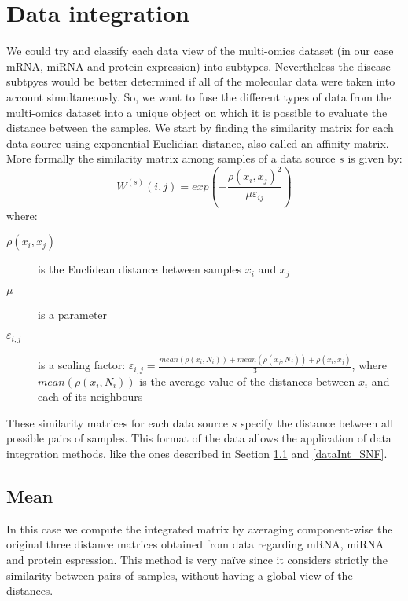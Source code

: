 \section{Data integration}\label{methods_dataInt}
We could try and classify each data view of the multi-omics dataset (in our case mRNA, miRNA and protein expression) into subtypes. Nevertheless the disease subtpyes would be better determined if all of the molecular data were taken into account simultaneously. So, we want to fuse the different types of data from the multi-omics dataset into a unique object on which it is possible to evaluate the distance between the samples. We start by finding the similarity matrix for each data source using exponential Euclidian distance, also called an affinity matrix.
More formally the similarity matrix among samples of a data source $s$ is given by:
\begin{equation} \label{eq:scaled_exponential_sim}
    W^{(s)}(i,j) = exp \left(- \frac{\rho(x_i,x_j)^2}{\mu \varepsilon_{ij}}\right)
\end{equation}
where:
\begin{description}
    \item [$\rho(x_i, x_j)$] is the Euclidean  distance  between samples \(x_i\) and \(x_j\)
    \item [$\mu$] is a parameter
    \item [$\varepsilon_{i,j}$] is a scaling factor: $\varepsilon_{i,j} = \frac{mean(\rho(x_i, N_i)) + mean(\rho(x_j, N_j)) + \rho(x_i, x_j)}{3}$, where  $mean(\rho(x_i, N_i))$ is the average value of the distances between $x_i$ and each of its neighbours
\end{description}
These similarity matrices for each data source $s$ specify the distance between all possible pairs of samples. This format of the data allows the application of data integration methods, like the ones described in Section \ref{dataInt_mean} and \ref{dataInt_SNF}.

\subsection{Mean} \label{dataInt_mean}
In this case we compute the integrated matrix by averaging component-wise the original three distance matrices obtained from data regarding mRNA, miRNA and protein espression. This method is very naïve since it considers strictly the similarity between pairs of samples, without having a global view of the distances.

